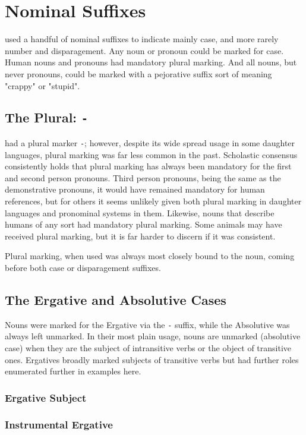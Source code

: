 \section{Nominal Suffixes}
\langname used a handful of nominal suffixes to indicate mainly case, and more rarely number and disparagement. Any noun or pronoun could be marked for case. Human nouns and pronouns had mandatory plural marking. And all nouns, but never pronouns, could be marked with a pejorative suffix sort of meaning "crappy" or "stupid".\par

\subsection{The Plural: \texttt{-\plural}}
\langname had a plural marker \texttt{-\plural}; however, despite its wide spread usage in some daughter languages, plural marking was far less common in the past. Scholastic consensus consistently holds that plural marking has always been mandatory for the first and second person pronouns. Third person pronouns, being the same as the demonstrative pronouns, it would have remained mandatory for human references, but for others it seems unlikely given both plural marking in daughter languages and pronominal systems in them. Likewise, nouns that describe humans of any sort had mandatory plural marking. Some animals may have received plural marking, but it is far harder to discern if it was consistent.\par
Plural marking, when used was always most closely bound to the noun, coming before both case or disparagement suffixes.\par

\subsection{The Ergative and Absolutive Cases}
Nouns were marked for the Ergative via the \texttt{-\erg} suffix, while the Absolutive was always left unmarked. In their most plain usage, nouns are unmarked (absolutive case) when they are the subject of intransitive verbs or the object of transitive ones. Ergatives broadly marked subjects of transitive verbs but had further roles enumerated further in examples here.
  \subsubsection{Ergative Subject}
  \subsubsection{Instrumental Ergative}
